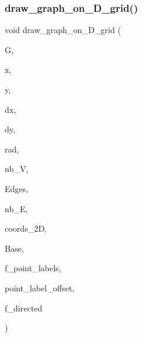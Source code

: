 \subsubsection{\texorpdfstring{draw\+\_\+graph\+\_\+on\+\_\+D\+\_\+grid()}{draw\_graph\_on\_2D\_grid()}}
{\footnotesize\ttfamily void draw\+\_\+graph\+\_\+on\+\_\+D\+\_\+grid (\begin{DoxyParamCaption}\item[{\mbox{\hyperlink{classmp__graphics}{mp\+\_\+graphics}} $\ast$}]{G,  }\item[{\mbox{\hyperlink{galois_8h_a09fddde158a3a20bd2dcadb609de11dc}{I\+NT}}}]{x,  }\item[{\mbox{\hyperlink{galois_8h_a09fddde158a3a20bd2dcadb609de11dc}{I\+NT}}}]{y,  }\item[{\mbox{\hyperlink{galois_8h_a09fddde158a3a20bd2dcadb609de11dc}{I\+NT}}}]{dx,  }\item[{\mbox{\hyperlink{galois_8h_a09fddde158a3a20bd2dcadb609de11dc}{I\+NT}}}]{dy,  }\item[{\mbox{\hyperlink{galois_8h_a09fddde158a3a20bd2dcadb609de11dc}{I\+NT}}}]{rad,  }\item[{\mbox{\hyperlink{galois_8h_a09fddde158a3a20bd2dcadb609de11dc}{I\+NT}}}]{nb\+\_\+V,  }\item[{\mbox{\hyperlink{galois_8h_a09fddde158a3a20bd2dcadb609de11dc}{I\+NT}} $\ast$}]{Edges,  }\item[{\mbox{\hyperlink{galois_8h_a09fddde158a3a20bd2dcadb609de11dc}{I\+NT}}}]{nb\+\_\+E,  }\item[{\mbox{\hyperlink{galois_8h_a09fddde158a3a20bd2dcadb609de11dc}{I\+NT}} $\ast$}]{coords\+\_\+2D,  }\item[{\mbox{\hyperlink{galois_8h_a09fddde158a3a20bd2dcadb609de11dc}{I\+NT}} $\ast$}]{Base,  }\item[{\mbox{\hyperlink{galois_8h_a09fddde158a3a20bd2dcadb609de11dc}{I\+NT}}}]{f\+\_\+point\+\_\+labels,  }\item[{\mbox{\hyperlink{galois_8h_a09fddde158a3a20bd2dcadb609de11dc}{I\+NT}}}]{point\+\_\+label\+\_\+offset,  }\item[{\mbox{\hyperlink{galois_8h_a09fddde158a3a20bd2dcadb609de11dc}{I\+NT}}}]{f\+\_\+directed }\end{DoxyParamCaption})}

\mbox{\label{draw_8_c_a63ab8fc9db24e6b7a4d0c2994ebb5013}} 

